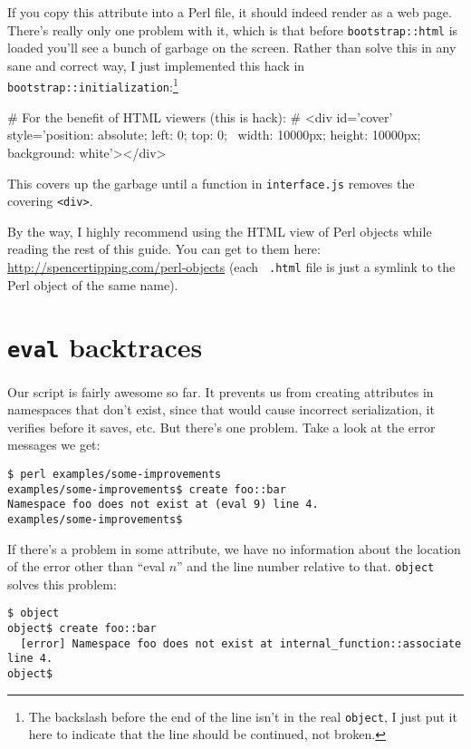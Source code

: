 \documentclass{report}
\begin{document}
  If you copy this attribute into a Perl file, it should indeed render as a web page. There's really only one problem with it, which is that before {\tt bootstrap::html} is loaded you'll see a
  bunch of garbage on the screen. Rather than solve this in any sane and correct way, I just implemented this hack in {\tt bootstrap::initialization}:\footnote{The backslash before the end of
  the line isn't in the real {\tt object}, I just put it here to indicate that the line should be continued, not broken.}

\begin{resourcecode}
# For the benefit of HTML viewers (this is hack):
# <div id='cover' style='position: absolute; left: 0; top: 0; \
    width: 10000px; height: 10000px; background: white'></div> \end{resourcecode}

  This covers up the garbage until a function in {\tt interface.js} removes the covering \verb|<div>|.

  By the way, I highly recommend using the HTML view of Perl objects while reading the rest of this guide. You can get to them here: \url{http://spencertipping.com/perl-objects} (each {\tt
  .html} file is just a symlink to the Perl object of the same name).

\chapter{{\tt eval} backtraces}\label{sec:eval-backtraces}
  Our script is fairly awesome so far. It prevents us from creating attributes in namespaces that don't exist, since that would cause incorrect serialization, it verifies before it saves, etc.
  But there's one problem. Take a look at the error messages we get:

\begin{verbatim}
$ perl examples/some-improvements
examples/some-improvements$ create foo::bar
Namespace foo does not exist at (eval 9) line 4.
examples/some-improvements$
\end{verbatim}

  If there's a problem in some attribute, we have no information about the location of the error other than ``eval $n$'' and the line number relative to that. {\tt object} solves this problem:

\begin{verbatim}
$ object
object$ create foo::bar
  [error] Namespace foo does not exist at internal_function::associate line 4.
object$
\end{verbatim}
\end{document}
